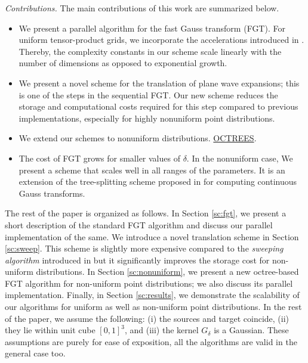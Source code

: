 {\em Contributions.} The main contributions of this work are summarized below.
\begin{itemize} 
%
\item We present a parallel algorithm for the fast Gauss transform (FGT). For uniform tensor-product grids, we incorporate the accelerations introduced in \cite{fggt}. Thereby, the complexity constants in our scheme scale linearly with the number of dimensions as opposed to exponential growth. 
%
\item We present a novel scheme for the translation of plane wave expansions; this is one of the steps in the sequential FGT. Our new scheme reduces the storage and computational costs required for this step compared to previous implementations, especially for highly nonuniform point distributions.
%
\item We extend our schemes to nonuniform distributions. \ul{OCTREES}.

\item The cost of FGT grows for smaller values of $\delta$. In the nonuniform case, 
We present a scheme that scales well in all ranges of the parameters. It is an extension of the tree-splitting scheme 
proposed in \cite{veerapaneni08} for computing continuous Gauss transforms. 
%
\end{itemize}

The rest of the paper is organized as follows. In Section \ref{sc:fgt}, we present a short description of the standard FGT algorithm and discuss our parallel implementation of the same. We introduce a novel translation scheme in Section \ref{sc:sweep}. This scheme is slightly more expensive compared to the {\em sweeping algorithm} introduced in \cite{greengard98} but it significantly improves the storage cost for non-uniform distributions. In Section 
\ref{sc:nonuniform}, we present a new octree-based FGT algorithm for non-uniform point distributions; we also discuss its parallel implementation. Finally, in Section \ref{sc:results}, we demonstrate the scalability of our algorithms for uniform as well as non-uniform point distributions. In the rest of the paper, we assume the following: (i) the sources and target coincide, (ii) they lie within unit cube $[0, 1]^3$, and (iii) the kernel $G_\delta$ is a Gaussian. These assumptions are purely for ease of exposition, all the algorithms are valid in the general case too. 